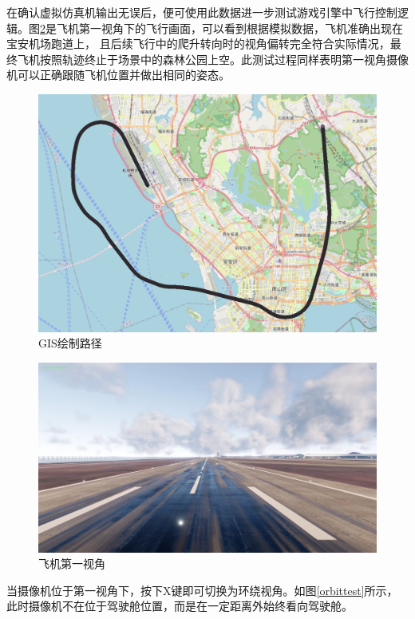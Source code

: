 \par
在确认虚拟仿真机输出无误后，便可使用此数据进一步测试游戏引擎中飞行控制逻辑。图\ref{firsttest}是飞机第一视角下的飞行画面，可以看到根据模拟数据，飞机准确出现在宝安机场跑道上，
且后续飞行中的爬升转向时的视角偏转完全符合实际情况，最终飞机按照轨迹终止于场景中的森林公园上空。此测试过程同样表明第一视角摄像机可以正确跟随飞机位置并做出相同的姿态。
\clearpage
\begin{figure}[h!]
    \begin{center}
        \includegraphics[width=.9\textwidth]{pictures/trace.png}
        \caption{GIS绘制路径}
        \label{GIStrace}
    \end{center}
\end{figure}
\begin{figure}[h!]
    \begin{center}
        \includegraphics[width=.9\textwidth]{pictures/firstcamera.png}
        \caption{飞机第一视角}
        \label{firsttest}
    \end{center}
\end{figure}
\par
当摄像机位于第一视角下，按下X键即可切换为环绕视角。如图\ref{orbittest}所示，此时摄像机不在位于驾驶舱位置，而是在一定距离外始终看向驾驶舱。

